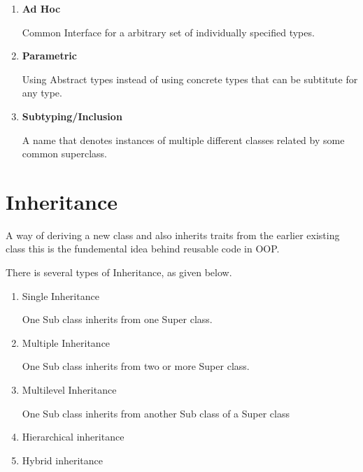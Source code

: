 \documentclass[12pt, a4paper]{book}
\begin{document}
    \begin{enumerate}[label=\arabic*.]

      \item \textbf{Ad Hoc}

        Common Interface for a arbitrary set of individually specified types.

        

      \item \textbf{Parametric}

        Using Abstract types instead of using concrete types that can be
        subtitute for any type.

        

      \item \textbf{Subtyping/Inclusion}

        A name that denotes instances of multiple different classes related
        by some common superclass.

        

    \end{enumerate}

  \section{Inheritance}

    A way of deriving a new class and also inherits traits from the earlier
    existing class this is the fundemental idea behind reusable code in OOP.

    There is several types of Inheritance, as given below.

    \begin{enumerate}[label=\arabic*.]
      \item Single Inheritance

        One Sub class inherits from one Super class.

        

      \item Multiple Inheritance

        One Sub class inherits from two or more Super class.

        

      \item Multilevel Inheritance

        One Sub class inherits from another Sub class of a Super class

        

      \item Hierarchical inheritance
      \item Hybrid inheritance
    \end{enumerate}
\end{document}

